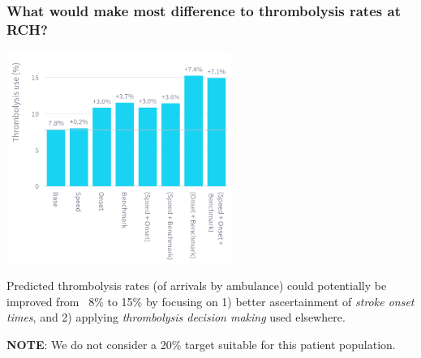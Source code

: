 \begin{frame}
\frametitle{\large{What would make most difference to thrombolysis rates at RCH?}}

\begin{center}

\includegraphics[width=0.55\textwidth]{./Truro/truro_improvement}

\small

    
\end{center}

\small
Predicted thrombolysis rates (of arrivals by ambulance) could potentially be improved from ~8\% to 15\% by focusing on 1) better ascertainment of \textit{stroke onset times}, and 2) applying \textit{thrombolysis decision making} used elsewhere. 

\vspace{2mm}

\textbf{NOTE}: We do not consider a 20\% target suitable for this patient population.

\end{frame}